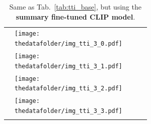 \documentclass[10pt]{article} %
\newcommand{\SM}[1]{\textcolor{blue}{[SM: #1]}}
\begin{document}
\begin{table}[h!]
\begin{tabular}{m{2.7cm} p{2.9cm} p{2.9cm} p{2.9cm} p{2.9cm}}
      \midrule
      \texttt{} \vspace{20mm} & \centering \texttt{[image: \\thedatafolder/img\_tti\_3\_0.pdf]} \\  & \centering \texttt{[image: \\thedatafolder/img\_tti\_3\_1.pdf]} \\  & \centering \texttt{[image: \\thedatafolder/img\_tti\_3\_2.pdf]} \\  & \centering \texttt{[image: \\thedatafolder/img\_tti\_3\_3.pdf]} \\   \tabularnewline
      \bottomrule
  \end{tabular}
  \caption{Same as Tab.~\ref{tab:tti_base}, but using the \textbf{\textcolor{deepred}{summary fine-tuned CLIP model}}.}
  \label{tab:tti}
\end{table}


\end{document}
